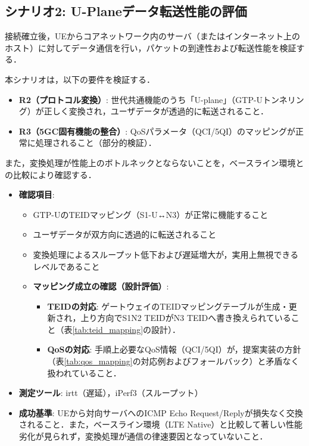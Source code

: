 \subsection{シナリオ2: U-Planeデータ転送性能の評価}
接続確立後，UEからコアネットワーク内のサーバ（またはインターネット上のホスト）に対してデータ通信を行い，パケットの到達性および転送性能を検証する．

本シナリオは，以下の要件を検証する．
\begin{itemize}
    \item \textbf{R2（プロトコル変換）}: 世代共通機能のうち「U-plane」（GTP-Uトンネリング）が正しく変換され，ユーザデータが透過的に転送されること．
    \item \textbf{R3（5GC固有機能の整合）}: QoSパラメータ（QCI/5QI）のマッピングが正常に処理されること（部分的検証）．
\end{itemize}

また，変換処理が性能上のボトルネックとならないことを，ベースライン環境との比較により確認する．
\begin{itemize}
    \item \textbf{確認項目}:
    \begin{itemize}
        \item GTP-UのTEIDマッピング（S1-U↔N3）が正常に機能すること
        \item ユーザデータが双方向に透過的に転送されること
        \item 変換処理によるスループット低下および遅延増大が，実用上無視できるレベルであること
        \item \textbf{マッピング成立の確認（設計評価）}:
        \begin{itemize}
            \item \textbf{TEIDの対応}: ゲートウェイのTEIDマッピングテーブルが生成・更新され，上り方向でS1N2 TEIDがN3 TEIDへ書き換えられていること（表\ref{tab:teid_mapping}の設計）．
            \item \textbf{QoSの対応}: 手順上必要なQoS情報（QCI/5QI）が，提案実装の方針（表\ref{tab:qos_mapping}の対応例およびフォールバック）と矛盾なく扱われていること．
        \end{itemize}
    \end{itemize}
    \item \textbf{測定ツール}: irtt（遅延），iPerf3（スループット）
    \item \textbf{成功基準}: UEから対向サーバへのICMP Echo Request/Replyが損失なく交換されること．また，ベースライン環境（LTE Native）と比較して著しい性能劣化が見られず，変換処理が通信の律速要因となっていないこと．
\end{itemize}
